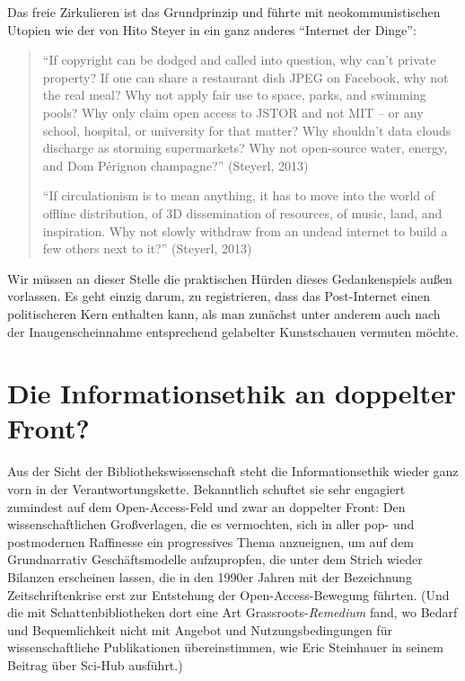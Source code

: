 \documentclass[a4paper,
fontsize=11pt,
oneside,
numbers=noperiodatend,
parskip=half-,
bibliography=totoc,
final
]{scrartcl}
\begin{document}
Das freie Zirkulieren ist das Grundprinzip und führte mit
neokommunistischen Utopien wie der von Hito Steyer in ein ganz anderes
\enquote{Internet der Dinge}:

\begin{quote}
\enquote{If copyright can be dodged and called into question, why can't
private property? If one can share a restaurant dish JPEG on Facebook,
why not the real meal? Why not apply fair use to space, parks, and
swimming pools? Why only claim open access to JSTOR and not MIT -- or
any school, hospital, or university for that matter? Why shouldn't data
clouds discharge as storming supermarkets? Why not open-source water,
energy, and Dom Pérignon champagne?} (Steyerl, 2013)

\enquote{If circulationism is to mean anything, it has to move into the
world of offline distribution, of 3D dissemination of resources, of
music, land, and inspiration. Why not slowly withdraw from an undead
internet to build a few others next to it?} (Steyerl, 2013)
\end{quote}

Wir müssen an dieser Stelle die praktischen Hürden dieses Gedankenspiels
außen vorlassen. Es geht einzig darum, zu registrieren, dass das
Post-Internet einen politischeren Kern enthalten kann, als man zunächst
unter anderem auch nach der Inaugenscheinnahme entsprechend gelabelter
Kunstschauen vermuten möchte.

\section*{Die Informationsethik an doppelter
Front?}\label{die-informationsethik-an-doppelter-front}

Aus der Sicht der Bibliothekswissenschaft steht die Informationsethik
wieder ganz vorn in der Verantwortungskette. Bekanntlich schuftet sie
sehr engagiert zumindest auf dem Open-Access-Feld und zwar an doppelter
Front: Den wissenschaftlichen Großverlagen, die es vermochten, sich in
aller pop- und postmodernen Raffinesse ein progressives Thema
anzueignen, um auf dem Grundnarrativ Geschäftsmodelle aufzupropfen, die
unter dem Strich wieder Bilanzen erscheinen lassen, die in den 1990er
Jahren mit der Bezeichnung Zeitschriftenkrise erst zur Entstehung der
Open-Access-Bewegung führten. (Und die mit Schattenbibliotheken dort
eine Art Grassroots-\emph{Remedium} fand, wo Bedarf und Bequemlichkeit
nicht mit Angebot und Nutzungsbedingungen für wissenschaftliche
Publikationen übereinstimmen, wie Eric Steinhauer in seinem Beitrag über
Sci-Hub ausführt.)
\end{document}
